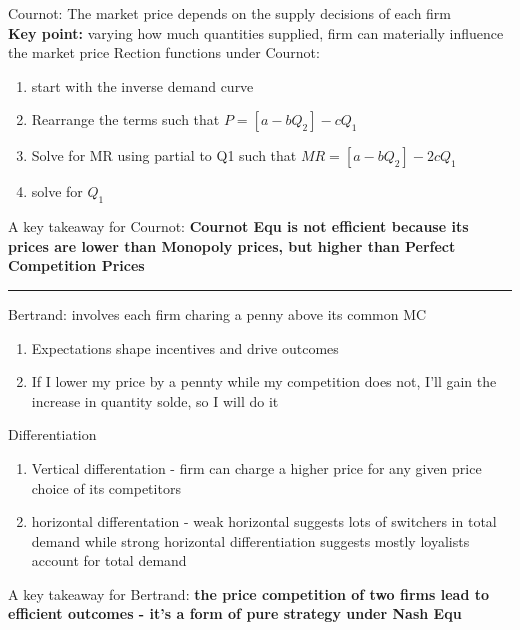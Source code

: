 \documentclass[8pt]{report}
\begin{document}
\begin{multicols}{3}
Cournot: The market price depends on the supply decisions of each firm \\
\textbf{Key point:} varying how much quantities supplied, firm can materially influence the market price
Rection functions under Cournot:
\begin{enumerate}
\item start with the inverse demand curve
\item Rearrange  the terms such that $P = [a-bQ_2] - cQ_1$
\item Solve for MR using partial to Q1 such that $MR = [a-bQ_2] - 2cQ_1$
\item solve for $Q_1$

\end{enumerate}

A key takeaway for Cournot: \textbf{Cournot Equ is not efficient because its prices are lower than Monopoly prices, but higher than Perfect Competition Prices}
\end{multicols}
\hrule 

\begin{multicols}{3}
Bertrand: involves each firm charing a penny above its common MC
\begin{enumerate}
\item Expectations shape incentives and drive outcomes
\item If I lower my price by a pennty while my competition does not, I'll gain the increase in quantity solde, so I will do it
\end{enumerate}

Differentiation 
\begin{enumerate}
\item Vertical differentation - firm can charge a higher price for any given price choice of its competitors 
\item horizontal differentation - weak horizontal suggests lots of switchers in total demand while strong horizontal differentiation suggests mostly loyalists account for total demand 
\end{enumerate}

A key takeaway for Bertrand: \textbf{the price competition of two firms lead to efficient outcomes - it's a form of pure strategy under Nash Equ}
\end{multicols}
\end{document}

